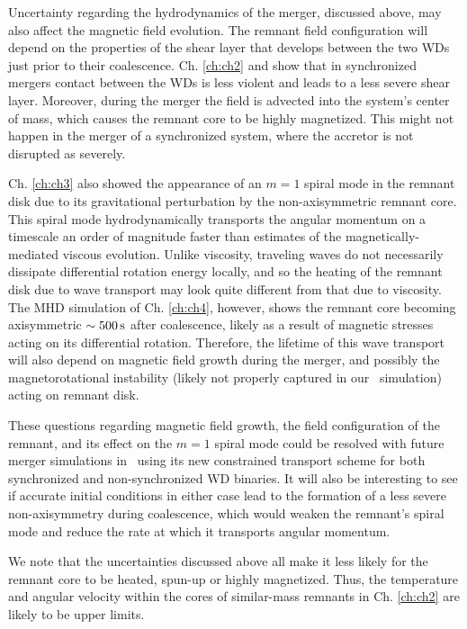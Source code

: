 Uncertainty regarding the hydrodynamics of the merger, discussed above, may also affect the magnetic field evolution.  The remnant field configuration will depend on the properties of the shear layer that develops between the two WDs just prior to their coalescence.  Ch. \ref{ch:ch2} and \cite{dan+14} show that in synchronized mergers contact between the WDs is less violent and leads to a less severe shear layer.  Moreover, during the merger the field is advected into the system's center of mass, which causes the remnant core to be highly magnetized.  This might not happen in the merger of a synchronized system, where the accretor is not disrupted as severely.

Ch. \ref{ch:ch3} also showed the appearance of an $m = 1$ spiral mode in the remnant disk due to its gravitational perturbation by the non-axisymmetric remnant core.  This spiral mode hydrodynamically transports the angular momentum on a timescale an order of magnitude faster than estimates of the magnetically-mediated viscous evolution.  Unlike viscosity, traveling waves do not necessarily dissipate differential rotation energy locally, and so the heating of the remnant disk due to wave transport may look quite different from that due to viscosity.  The MHD simulation of Ch. \ref{ch:ch4}, however, shows the remnant core becoming axisymmetric $\sim500\,\mathrm{s}$ after coalescence, likely as a result of magnetic stresses acting on its differential rotation.  Therefore, the lifetime of this wave transport will also depend on magnetic field growth during the merger, and possibly the magnetorotational instability (likely not properly captured in our \arepo\ simulation) acting on remnant disk.

These questions regarding magnetic field growth, the field configuration of the remnant, and its effect on the $m = 1$ spiral mode could be resolved with future merger simulations in \arepo\ using its new constrained transport scheme for both synchronized and non-synchronized WD binaries.  It will also be interesting to see if accurate initial conditions in either case lead to the formation of a less severe non-axisymmetry during coalescence, which would weaken the remnant's spiral mode and reduce the rate at which it transports angular momentum.  

We note that the uncertainties discussed above all make it less likely for the remnant core to be heated, spun-up or highly magnetized.  Thus, the temperature and angular velocity within the cores of similar-mass remnants in Ch. \ref{ch:ch2} are likely to be upper limits.

